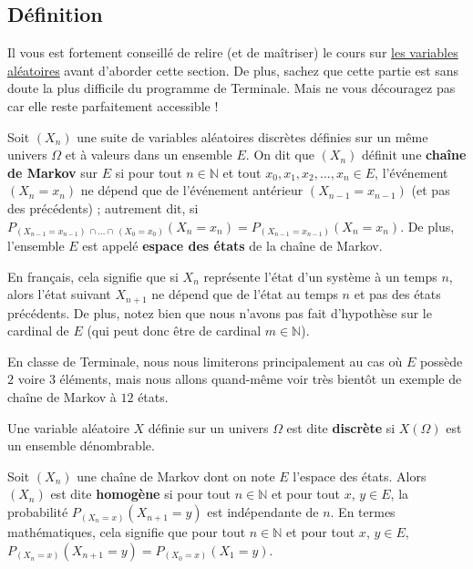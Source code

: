 	\subsection{Définition}

	Il vous est fortement conseillé de relire (et de maîtriser) le cours sur \href{https://bacomathiqu.es/cours/terminale/variables-aleatoires-concentration-grands-nombres/}{les variables aléatoires} avant d'aborder cette section. De plus, sachez que cette partie est sans doute la plus difficile du programme de Terminale. Mais ne vous découragez pas car elle reste parfaitement accessible !

	\begin{formula}[Définition]
		Soit $(X_n)$ une suite de variables aléatoires discrètes définies sur un même univers $\Omega$ et à valeurs dans un ensemble $E$. On dit que $(X_n)$ définit une \textbf{chaîne de Markov} sur $E$ si pour tout $n \in \mathbb{N}$ et tout $x_0, x_1, x_2, \dots, x_n \in E$, l'événement $(X_n = x_n)$ ne dépend que de l'événement antérieur $(X_{n-1} = x_{n-1})$ (et pas des précédents) ; autrement dit, si $P_{(X_{n-1} = x_{n-1}) \, \cap \dots \cap \, (X_0 = x_0)}(X_n = x_n) = P_{(X_{n-1} = x_{n-1})}(X_n = x_n)$.
		\newpar
		De plus, l'ensemble $E$ est appelé \textbf{espace des états} de la chaîne de Markov.
	\end{formula}

	En français, cela signifie que si $X_n$ représente l'état d'un système à un temps $n$, alors l'état suivant $X_{n+1}$ ne dépend que de l'état au temps $n$ et pas des états précédents.
	De plus, notez bien que nous n'avons pas fait d'hypothèse sur le cardinal de $E$ (qui peut donc être de cardinal $m \in \mathbb{N}$).
	\begin{nosummary}
		\newpar
		En classe de Terminale, nous nous limiterons principalement au cas où $E$ possède $2$ voire $3$ éléments, mais nous allons quand-même voir très bientôt un exemple de chaîne de Markov à $12$ états.
	\end{nosummary}

	\begin{tip}
		Une variable aléatoire $X$ définie sur un univers $\Omega$ est dite \textbf{discrète} si $X(\Omega)$ est un ensemble dénombrable.
	\end{tip}

	\begin{formula}
		Soit $(X_n)$ une chaîne de Markov dont on note $E$ l'espace des états. Alors $(X_n)$ est dite \textbf{homogène} si pour tout $n \in \mathbb{N}$ et pour tout $x$, $y \in E$, la probabilité $P_{(X_n = x)}(X_{n+1} = y)$ est indépendante de $n$.
		\newpar
		En termes mathématiques, cela signifie que pour tout $n \in \mathbb{N}$ et pour tout $x$, $y \in E$, $P_{(X_n = x)}(X_{n+1} = y) = P_{(X_0 = x)}(X_1 = y)$.
	\end{formula}

